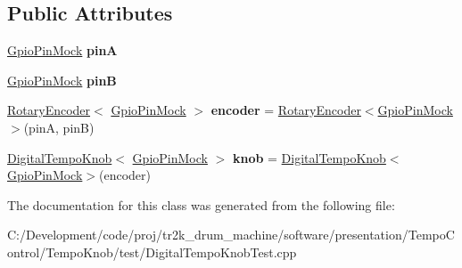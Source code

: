 \subsection*{Public Attributes}
\begin{DoxyCompactItemize}
\item 
\mbox{\label{class_digital_tempo_knob_test_a19d0db64dfb498356b8abb78c6992c80}} 
\mbox{\hyperlink{class_gpio_pin_mock}{Gpio\+Pin\+Mock}} {\bfseries pinA}
\item 
\mbox{\label{class_digital_tempo_knob_test_a22f3392dbcacb2b0ed639543776eba55}} 
\mbox{\hyperlink{class_gpio_pin_mock}{Gpio\+Pin\+Mock}} {\bfseries pinB}
\item 
\mbox{\label{class_digital_tempo_knob_test_ad7b5c9ecbdd01609c42686ee1a7545cf}} 
\mbox{\hyperlink{class_rotary_encoder}{Rotary\+Encoder}}$<$ \mbox{\hyperlink{class_gpio_pin_mock}{Gpio\+Pin\+Mock}} $>$ {\bfseries encoder} = \mbox{\hyperlink{class_rotary_encoder}{Rotary\+Encoder}}$<$\mbox{\hyperlink{class_gpio_pin_mock}{Gpio\+Pin\+Mock}}$>$(pinA, pinB)
\item 
\mbox{\label{class_digital_tempo_knob_test_a15b9dee201553e773b8490cf44b3b9f5}} 
\mbox{\hyperlink{class_digital_tempo_knob}{Digital\+Tempo\+Knob}}$<$ \mbox{\hyperlink{class_gpio_pin_mock}{Gpio\+Pin\+Mock}} $>$ {\bfseries knob} = \mbox{\hyperlink{class_digital_tempo_knob}{Digital\+Tempo\+Knob}}$<$\mbox{\hyperlink{class_gpio_pin_mock}{Gpio\+Pin\+Mock}}$>$(encoder)
\end{DoxyCompactItemize}


The documentation for this class was generated from the following file\+:\begin{DoxyCompactItemize}
\item 
C\+:/\+Development/code/proj/tr2k\+\_\+drum\+\_\+machine/software/presentation/\+Tempo\+Control/\+Tempo\+Knob/test/Digital\+Tempo\+Knob\+Test.\+cpp\end{DoxyCompactItemize}
